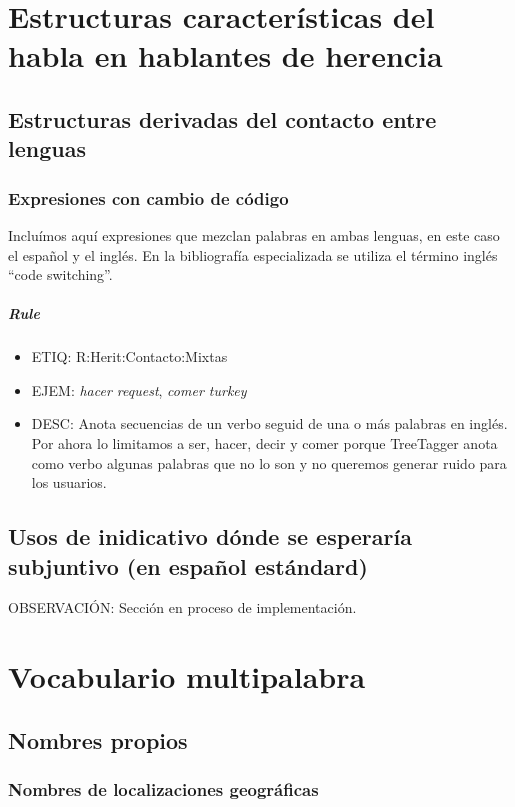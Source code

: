 \documentclass[11pt]{report}
\begin{document}
\chapter{Estructuras características del habla en hablantes de herencia}
\section{Estructuras derivadas del contacto entre lenguas}
\subsection{Expresiones con cambio de código}
Incluímos aquí expresiones que mezclan palabras en ambas lenguas, en este caso el español y el inglés. En la bibliografía especializada se utiliza el término inglés ``code switching''.

\paragraph*{Rule}
\begin{itemize}
\item ETIQ: R:Herit:Contacto:Mixtas
\item EJEM: \emph{hacer request}, \emph{comer turkey}
\item DESC: Anota secuencias de un verbo seguid de una o más palabras en inglés. Por ahora lo limitamos a ser, hacer, decir y comer porque TreeTagger anota como verbo algunas palabras que no lo son y no queremos generar ruido para los usuarios.
\end{itemize}

\section{Usos de inidicativo dónde se esperaría subjuntivo (en español estándard)}
OBSERVACIÓN: Sección en proceso de implementación.

\chapter{Vocabulario multipalabra}
\section{Nombres propios}
\subsection{Nombres de localizaciones geográficas}
\end{document}
